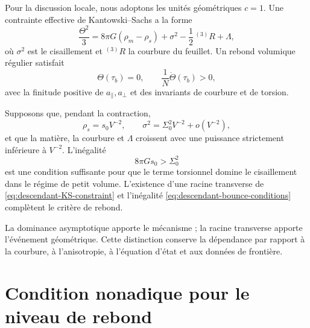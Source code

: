 Pour la discussion locale, nous adoptons les unités géométriques \(c=1\). Une
contrainte effective de Kantowski--Sachs a la forme
\begin{equation}
 \frac{\Theta^2}{3}
 =8\pi G(\rho_m-\rho_s)
 +\sigma^2-\frac12\,{}^{(3)}R+\Lambda,
 \label{eq:descendant-KS-constraint}
\end{equation}
où \(\sigma^2\) est le cisaillement et \({}^{(3)}R\) la courbure du feuillet.
Un rebond volumique régulier satisfait
\begin{equation}
 \boxed{
 \Theta(\tau_b)=0,
 \qquad
 \frac1N\dot\Theta(\tau_b)>0,}
 \label{eq:descendant-bounce-conditions}
\end{equation}
avec la finitude positive de \(a_\parallel,a_\perp\) et des invariants
de courbure et de torsion.

\begin{criterion}
\label{crit:descendant-torsion-dominance}
Supposons que, pendant la contraction,
\begin{equation}
 \rho_s=s_0V^{-2},
 \qquad
 \sigma^2=\Sigma_0^2V^{-2}+o(V^{-2}),
 \label{eq:descendant-torsion-shear-scaling}
\end{equation}
et que la matière, la courbure et \(\Lambda\) croissent avec une puissance strictement
inférieure à \(V^{-2}\). L'inégalité
\begin{equation}
 \boxed{8\pi Gs_0>\Sigma_0^2}
 \label{eq:descendant-torsion-dominates-shear}
\end{equation}
est une condition suffisante pour que le terme torsionnel domine le
cisaillement dans le régime de petit volume. L'existence d'une racine
transverse de \cref{eq:descendant-KS-constraint} et l'inégalité
\cref{eq:descendant-bounce-conditions} complètent le critère de rebond.
\end{criterion}

La dominance asymptotique apporte le mécanisme ; la racine transverse apporte
l'événement géométrique. Cette distinction conserve la dépendance par rapport à la
courbure, à l'anisotropie, à l'équation d'état et aux données de frontière.

\section{Condition nonadique pour le niveau de rebond}

